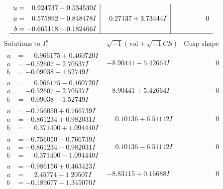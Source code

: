 \documentclass[1p]{elsarticle_modified}
\theoremstyle{definition}
\newcommand{\I}{\sqrt{-1}}
\begin{document}
$$\begin{array}{c|c|c}
\begin{aligned}
u &= \phantom{-}0.924737 - 0.534530 I \\
a &= \phantom{-}0.575892 - 0.848478 I \\
b &= -0.665118 - 0.182466 I\end{aligned}
 & \phantom{-}0.27137 + 3.73444 I & \phantom{-0.000000 } 0\\
 \hline 
 \end{array}$$\newpage$$\begin{array}{c|c|c}  
\text{Solutions to }I^u_{1}& \I (\text{vol} + \sqrt{-1}CS) & \text{Cusp shape}\\
 \hline 
\begin{aligned}
u &= \phantom{-}0.966175 + 0.460720 I \\
a &= -0.52607 - 2.70537 I \\
b &= -0.09038 - 1.52749 I\end{aligned}
 & -8.90441 - 5.42664 I & \phantom{-0.000000 } 0 \\ \hline\begin{aligned}
u &= \phantom{-}0.966175 - 0.460720 I \\
a &= -0.52607 + 2.70537 I \\
b &= -0.09038 + 1.52749 I\end{aligned}
 & -8.90441 + 5.42664 I & \phantom{-0.000000 } 0 \\ \hline\begin{aligned}
u &= -0.756050 + 0.766739 I \\
a &= -0.861234 + 0.982031 I \\
b &= \phantom{-}0.371400 + 1.094440 I\end{aligned}
 & \phantom{-}0.10136 + 6.51112 I & \phantom{-0.000000 } 0 \\ \hline\begin{aligned}
u &= -0.756050 - 0.766739 I \\
a &= -0.861234 - 0.982031 I \\
b &= \phantom{-}0.371400 - 1.094440 I\end{aligned}
 & \phantom{-}0.10136 - 6.51112 I & \phantom{-0.000000 } 0 \\ \hline\begin{aligned}
u &= -0.986156 + 0.463423 I \\
a &= \phantom{-}2.45774 - 1.20507 I \\
b &= -0.189677 - 1.345070 I\end{aligned}
 & -8.83115 + 0.16688 I & \phantom{-0.000000 } 0 \\ \hline\begin{aligned}

\end{aligned}
\end{array}$$
\end{document}
